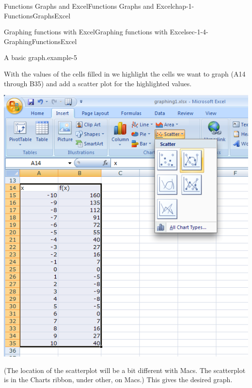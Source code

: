 \documentclass[oneside,10pt,]{book}
\numberwithin{equation}{section}
\begin{document}
\begin{chapterptx}{Functions Graphs and Excel}{}{Functions Graphs and Excel}{}{}{chap-1-FunctionsGraphsExcel}
\begin{sectionptx}{Graphing functions with Excel}{}{Graphing functions with Excel}{}{}{sec-1-4-GraphingFunctionsExcel}
\begin{example}{A basic graph.}{example-5}
\begin{sidebyside}{1}{0.2}{0.2}{0}
\begin{sbspanel}{0.6}
\end{sbspanel}%
\end{sidebyside}%
\par
\hypertarget{p-319}{}%
With the values of the cells filled in we highlight the cells we want to graph (A14 through B35) and add a scatter plot for the highlighted values.%
\begin{sidebyside}{1}{0.1}{0.1}{0}%
\begin{sbspanel}{0.8}%
\includegraphics[width=1\linewidth]{images/sec1-4-3.png}
\end{sbspanel}%
\end{sidebyside}%
\par
\hypertarget{p-320}{}%
(The location of the scatterplot will be a bit different with Macs.  The scatterplot is in the Charts ribbon, under other, on Macs.)  This gives the desired graph.%
\begin{sidebyside}{1}{0.1}{0.1}{0}%
\begin{sbspanel}{0.8}%

\end{sbspanel}
\end{sidebyside}
\end{example}
\end{sectionptx}
\end{chapterptx}
\end{document}
